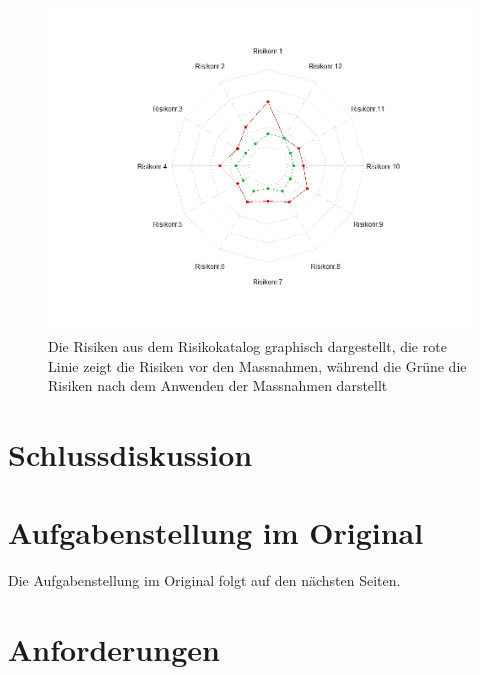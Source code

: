 \documentclass[a4paper]{report}
\begin{document}
\begin{figure}[h!]
	\centering
	\includegraphics[width=\textwidth,keepaspectratio]{Risikomatrix_Spinne}
	\caption{Die Risiken aus dem Risikokatalog graphisch dargestellt, die rote Linie zeigt die Risiken vor den Massnahmen, während die Grüne die Risiken nach dem Anwenden der Massnahmen darstellt}
	\label{fig:Risikomatrix_Spinne}
\end{figure}

\chapter{Schlussdiskussion}
\label{ch:SchlussDisku}
\listoffigures

\listoftables

\printbibliography

\appendix

\chapter{Aufgabenstellung im Original}
\label{app:ch:AufgabenOriginal}
Die Aufgabenstellung im Original folgt auf den nächsten Seiten.



\chapter{Anforderungen}
\label{app:ch:Anforderungen}
\end{document}
